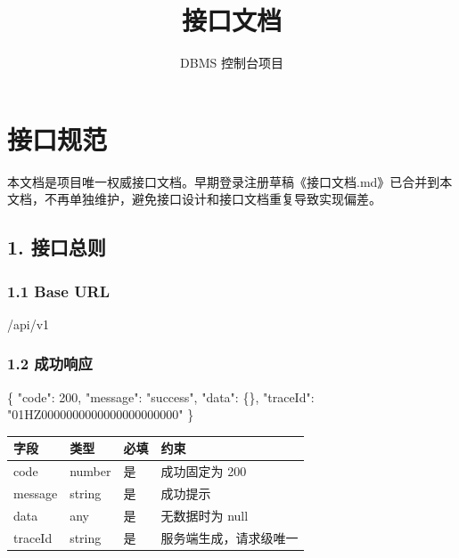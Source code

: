 \documentclass[
  a4paper,
  UTF8]{ctexart}
\title{接口文档}
\author{DBMS 控制台项目}
\date{}
\newenvironment{Shaded}{}{}
\newcommand{\DataTypeTok}[1]{\textcolor[rgb]{0.56,0.13,0.00}{#1}}
\newcommand{\DecValTok}[1]{\textcolor[rgb]{0.25,0.63,0.44}{#1}}
\newcommand{\FunctionTok}[1]{\textcolor[rgb]{0.02,0.16,0.49}{#1}}
\newcommand{\NormalTok}[1]{#1}
\newcommand{\StringTok}[1]{\textcolor[rgb]{0.25,0.44,0.63}{#1}}
\begin{document}
\maketitle

\renewcommand*\contentsname{目录}
{
\hypersetup{linkcolor=}
\setcounter{tocdepth}{3}
\tableofcontents
}
\hypertarget{ux63a5ux53e3ux89c4ux8303}{%
\section{接口规范}\label{ux63a5ux53e3ux89c4ux8303}}

本文档是项目唯一权威接口文档。早期登录注册草稿《接口文档.md》已合并到本文档，不再单独维护，避免接口设计和接口文档重复导致实现偏差。

\hypertarget{ux63a5ux53e3ux603bux5219}{%
\subsection{1. 接口总则}\label{ux63a5ux53e3ux603bux5219}}

\hypertarget{base-url}{%
\subsubsection{1.1 Base URL}\label{base-url}}

\begin{Shaded}
\begin{Highlighting}[]
\NormalTok{/api/v1}
\end{Highlighting}
\end{Shaded}

\hypertarget{ux6210ux529fux54cdux5e94}{%
\subsubsection{1.2 成功响应}\label{ux6210ux529fux54cdux5e94}}

\begin{Shaded}
\begin{Highlighting}[]
\FunctionTok{\{}
  \DataTypeTok{"code"}\FunctionTok{:} \DecValTok{200}\FunctionTok{,}
  \DataTypeTok{"message"}\FunctionTok{:} \StringTok{"success"}\FunctionTok{,}
  \DataTypeTok{"data"}\FunctionTok{:} \FunctionTok{\{\},}
  \DataTypeTok{"traceId"}\FunctionTok{:} \StringTok{"01HZ0000000000000000000000"}
\FunctionTok{\}}
\end{Highlighting}
\end{Shaded}

\begin{longtable}[]{@{}llll@{}}
\toprule
字段 & 类型 & 必填 & 约束 \\
\midrule
\endhead
code & number & 是 & 成功固定为 200 \\
message & string & 是 & 成功提示 \\
data & any & 是 & 无数据时为 null \\
traceId & string & 是 & 服务端生成，请求级唯一 \\
\bottomrule
\end{longtable}
\end{document}
